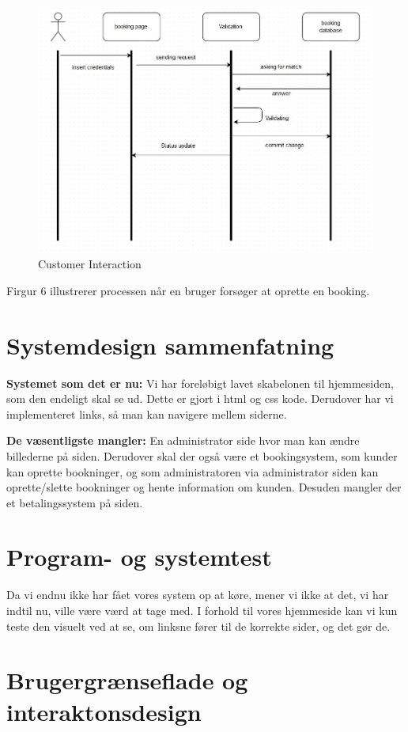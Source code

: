 \documentclass[12pt,a4paper]{article}
\begin{document}
\begin{figure}[H]
\centering
\includegraphics[scale=0.6]{customerLog-in.jpg}
\caption{Customer Interaction}
\end{figure}
Firgur 6 illustrerer processen når en bruger forsøger at oprette en booking.
\newpage
\section{Systemdesign sammenfatning}
\textbf{Systemet som det er nu:}
Vi har foreløbigt lavet skabelonen til hjemmesiden, som den endeligt skal se ud. Dette er gjort i html og css kode. Derudover har vi implementeret links, så man kan navigere mellem siderne. 

\textbf{De væsentligste mangler:}
En administrator side hvor man kan ændre billederne på siden. 
Derudover skal der også være et bookingsystem, som kunder kan oprette bookninger, og som administratoren via administrator siden kan oprette/slette bookninger og hente information om kunden. Desuden mangler der et betalingssystem på siden.

\section{Program- og systemtest}
Da vi endnu ikke har fået vores system op at køre, mener vi ikke at det, vi har indtil nu, ville være værd at tage med. I forhold til vores hjemmeside kan vi kun teste den visuelt ved at se, om linksne fører til de korrekte sider, og det gør de.

\section{Brugergrænseflade og interaktonsdesign}
\end{document}
